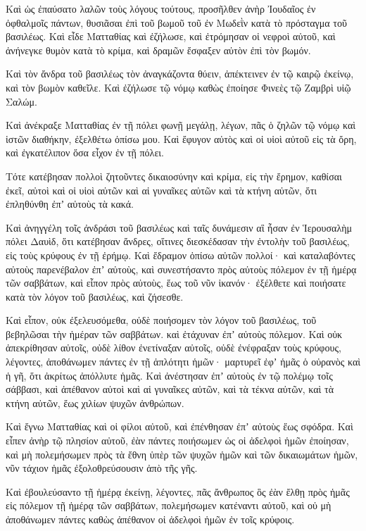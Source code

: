 {\par }{\PP {}Καὶ ὡς ἐπαύσατο λαλῶν τοὺς λόγους τούτους, προσῆλθεν ἀνὴρ Ἰουδαῖος ἐν ὀφθαλμοῖς πάντων, θυσιᾶσαι ἐπὶ τοῦ βωμοῦ τοῦ ἐν Μωδεῒν κατὰ τὸ πρόσταγμα τοῦ βασιλέως.
Καὶ εἶδε Ματταθίας καὶ ἐζήλωσε, καὶ ἐτρόμησαν οἱ νεφροὶ αὐτοῦ, καὶ ἀνήνεγκε θυμὸν κατὰ τὸ κρίμα, καὶ δραμῶν ἔσφαξεν αὐτὸν ἐπὶ τὸν βωμόν.
\par }{\PP {}Καὶ τὸν ἄνδρα τοῦ βασιλέως τὸν ἀναγκάζοντα θύειν, ἀπέκτεινεν ἐν τῷ καιρῷ ἐκείνῳ, καὶ τὸν βωμὸν καθεῖλε.
Καὶ ἐζήλωσε τῷ νόμῳ καθὼς ἐποίησε Φινεὲς τῷ Ζαμβρὶ υἱῷ Σαλώμ.
\par }{\PP {}Καὶ ἀνέκραξε Ματταθίας ἐν τῇ πόλει φωνῇ μεγάλῃ, λέγων, πᾶς ὁ ζηλῶν τῷ νόμῳ καὶ ἱστῶν διαθήκην, ἐξελθέτω ὀπίσω μου.
Καὶ ἔφυγον αὐτὸς καὶ οἱ υἱοὶ αὐτοῦ εἰς τὰ ὄρη, καὶ ἐγκατέλιπον ὅσα εἶχον ἐν τῇ πόλει.
\par }{\PP {}Τότε κατέβησαν πολλοὶ ζητοῦντες δικαιοσύνην καὶ κρίμα, εἰς τὴν ἔρημον, καθίσαι ἐκεῖ,
αὐτοὶ καὶ οἱ υἱοὶ αὐτῶν καὶ αἱ γυναῖκες αὐτῶν καὶ τὰ κτήνη αὐτῶν, ὅτι ἐπληθύνθη ἐπʼ αὐτοὺς τὰ κακά.
\par }{\PP {}Καὶ ἀνηγγέλη τοῖς ἀνδράσι τοῦ βασιλέως καὶ ταῖς δυνάμεσιν αἳ ἦσαν ἐν Ἱερουσαλὴμ πόλει Δαυὶδ, ὅτι κατέβησαν ἄνδρες, οἵτινες διεσκέδασαν τὴν ἐντολὴν τοῦ βασιλέως, εἰς τοὺς κρύφους ἐν τῇ ἐρήμῳ.
Καὶ ἔδραμον ὀπίσω αὐτῶν πολλοί· καὶ καταλαβόντες αὐτοὺς παρενέβαλον ἐπʼ αὐτοὺς, καὶ συνεστήσαντο πρὸς αὐτοὺς πόλεμον ἐν τῇ ἡμέρᾳ τῶν σαββάτων,
καὶ εἶπον πρὸς αὐτοὺς, ἕως τοῦ νῦν ἱκανόν· ἐξέλθετε καὶ ποιήσατε κατὰ τὸν λόγον τοῦ βασιλέως, καὶ ζήσεσθε.
\par }{\PP {}Καὶ εἶπον, οὐκ ἐξελευσόμεθα, οὐδὲ ποιήσομεν τὸν λόγον τοῦ βασιλέως, τοῦ βεβηλῶσαι τὴν ἡμέραν τῶν σαββάτων.
καὶ ἐτάχυναν ἐπʼ αὐτοὺς πόλεμον.
Καὶ οὐκ ἀπεκρίθησαν αὐτοῖς, οὐδὲ λίθον ἐνετίναξαν αὐτοῖς, οὐδὲ ἐνέφραξαν τοὺς κρύφους,
λέγοντες, ἀποθάνωμεν πάντες ἐν τῇ ἁπλότητι ἡμῶν· μαρτυρεῖ ἐφʼ ἡμᾶς ὁ οὐρανὸς καὶ ἡ γῆ, ὅτι ἀκρίτως ἀπόλλυτε ἡμᾶς.
Καὶ ἀνέστησαν ἐπʼ αὐτοὺς ἐν τῷ πολέμῳ τοῖς σάββασι, καὶ ἀπέθανον αὐτοὶ καὶ αἱ γυναῖκες αὐτῶν, καὶ τὰ τέκνα αὐτῶν, καὶ τὰ κτήνη αὐτῶν, ἕως χιλίων ψυχῶν ἀνθρώπων.
\par }{\PP {}Καὶ ἔγνω Ματταθίας καὶ οἱ φίλοι αὐτοῦ, καὶ ἐπένθησαν ἐπʼ αὐτοὺς ἕως σφόδρα.
Καὶ εἶπεν ἀνὴρ τῷ πλησίον αὐτοῦ, ἐὰν πάντες ποιήσωμεν ὡς οἱ ἀδελφοὶ ἡμῶν ἐποίησαν, καὶ μὴ πολεμήσωμεν πρὸς τὰ ἔθνη ὑπὲρ τῶν ψυχῶν ἡμῶν καὶ τῶν δικαιωμάτων ἡμῶν, νῦν τάχιον ἡμᾶς ἐξολοθρεύσουσιν ἀπὸ τῆς γῆς.
\par }{\PP {}Καὶ ἐβουλεύσαντο τῇ ἡμέρᾳ ἐκείνῃ, λέγοντες, πᾶς ἄνθρωπος ὃς ἐὰν ἔλθῃ πρὸς ἡμᾶς εἰς πόλεμον τῇ ἡμέρᾳ τῶν σαββάτων, πολεμήσωμεν κατέναντι αὐτοῦ, καὶ οὐ μὴ ἀποθάνωμεν πάντες καθὼς ἀπέθανον οἱ ἀδελφοὶ ἡμῶν ἐν τοῖς κρύφοις.
}
